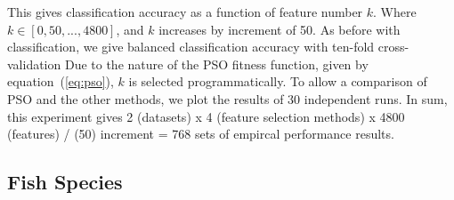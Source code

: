 \documentclass[runningheads]{llncs}
\begin{document}
This gives classification accuracy as a function of feature number $k$. 
Where $k \in [0,50,...,4800]$, and $k$ increases by increment of 50.
As before with classification, we give balanced classification accuracy with ten-fold cross-validation
Due to the nature of the PSO fitness function, given by equation~(\ref{eq:pso}), $k$ is selected programmatically. 
To allow a comparison of PSO and the other methods, we plot the results of 30 independent runs. 
In sum, this experiment gives 2 (datasets) x 4 (feature selection methods) x 4800 (features) / (50) increment = 768 sets of empircal performance results.


\subsection{Fish Species}
\end{document}
